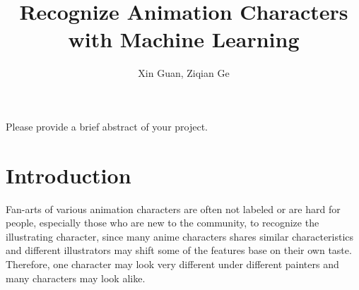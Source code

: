 \documentclass[11.5pt]{article}
\title{Recognize Animation Characters with Machine Learning}
\author{Xin Guan, Ziqian Ge}
\date{}
\begin{document}
    \maketitle

    \abstract
    Please provide a brief abstract of your project.
    

    \vspace{2mm}


    \section{Introduction}
    Fan-arts of various animation characters are often not labeled or are hard for people, especially those who are new to the community, to recognize the illustrating character, since many anime characters shares similar characteristics and different illustrators may shift some of the features base on their own taste. Therefore, one character may look very different under different painters and many characters may look alike.
\end{document}
